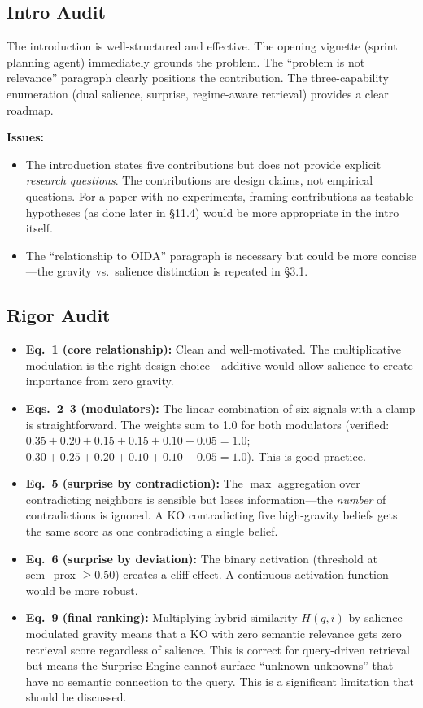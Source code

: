 \documentclass[11pt,a4paper]{article}
\begin{document}
\subsection{Intro Audit}

The introduction is well-structured and effective. The opening vignette (sprint planning agent) immediately grounds the problem. The ``problem is not relevance'' paragraph clearly positions the contribution. The three-capability enumeration (dual salience, surprise, regime-aware retrieval) provides a clear roadmap.

\textbf{Issues:}
\begin{itemize}[nosep]
\item The introduction states five contributions but does not provide explicit \emph{research questions}. The contributions are design claims, not empirical questions. For a paper with no experiments, framing contributions as testable hypotheses (as done later in \S11.4) would be more appropriate in the intro itself.
\item The ``relationship to OIDA'' paragraph is necessary but could be more concise---the gravity vs.\ salience distinction is repeated in \S3.1.
\end{itemize}

\subsection{Rigor Audit}

\begin{itemize}[nosep]
\item \textbf{Eq.~1 (core relationship):} Clean and well-motivated. The multiplicative modulation is the right design choice---additive would allow salience to create importance from zero gravity.
\item \textbf{Eqs.~2--3 (modulators):} The linear combination of six signals with a clamp is straightforward. The weights sum to 1.0 for both modulators (verified: $0.35+0.20+0.15+0.15+0.10+0.05 = 1.0$; $0.30+0.25+0.20+0.10+0.10+0.05 = 1.0$). This is good practice.
\item \textbf{Eq.~5 (surprise by contradiction):} The $\max$ aggregation over contradicting neighbors is sensible but loses information---the \emph{number} of contradictions is ignored. A KO contradicting five high-gravity beliefs gets the same score as one contradicting a single belief.
\item \textbf{Eq.~6 (surprise by deviation):} The binary activation (threshold at sem\_prox $\geq 0.50$) creates a cliff effect. A continuous activation function would be more robust.
\item \textbf{Eq.~9 (final ranking):} Multiplying hybrid similarity $H(q,i)$ by salience-modulated gravity means that a KO with zero semantic relevance gets zero retrieval score regardless of salience. This is correct for query-driven retrieval but means the Surprise Engine cannot surface ``unknown unknowns'' that have no semantic connection to the query. This is a significant limitation that should be discussed.
\end{itemize}
\end{document}
